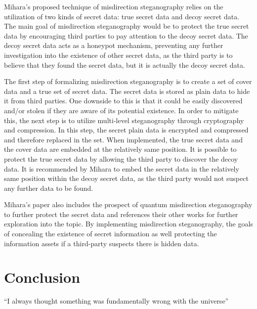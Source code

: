 \documentclass{article}
\begin{document}
Mihara’s proposed technique of misdirection steganography relies on the utilization of two kinds of secret data: true secret data and decoy secret data. The main goal of misdirection steganography would be to protect the true secret data by encouraging third parties to pay attention to the decoy secret data. The decoy secret data acts as a honeypot mechanism, preventing any further investigation into the existence of other secret data, as the third party is to believe that they found the secret data, but it is actually the decoy secret data.

The first step of formalizing misdirection steganography is to create a set of cover data and a true set of secret data. The secret data is stored as plain data to hide it from third parties. One downside to this is that it could be easily discovered and/or stolen if they are aware of its potential existence. In order to mitigate this, the next step is to utilize multi-level steganography through cryptography and compression. In this step, the secret plain data is encrypted and compressed and therefore replaced in the set. When implemented, the true secret data and the cover data are embedded at the relatively same position. It is possible to protect the true secret data by allowing the third party to discover the decoy data. It is recommended by Mihara to embed the secret data in the relatively same position within the decoy secret data, as the third party would not suspect any further data to be found. 

Mihara’s paper also includes the prospect of quantum misdirection steganography to further protect the secret data and references their other works for further exploration into the topic. By implementing misdirection steganography, the goals of concealing the existence of secret information as well protecting the information assets if a third-party suspects there is hidden data. \citep{mihara}

\section{Conclusion}
``I always thought something was fundamentally wrong with the universe''



\end{document}
